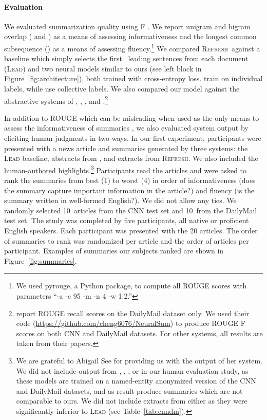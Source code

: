 \documentclass[11pt,a4paper]{article}
\newcommand\refresh{\textsc{Refresh}}
\begin{document}
\paragraph{Evaluation}
We evaluated summarization quality using F 
\cite{rouge}. We report unigram and bigram overlap (
and ) as a means of assessing informativeness and the
longest common subsequence () as a means of assessing
fluency.\footnote{We used pyrouge, a Python package, to compute all
  ROUGE scores with parameters ``-a -c 95 -m -n 4 -w 1.2.''}  We
compared \refresh\ against a baseline which simply selects the first
~leading sentences from each document (\textsc{Lead}) and two
neural models similar to ours (see left block in
Figure~\ref{fig:architecture}), both trained with cross-entropy loss.
 train on individual labels, while
 use collective labels. We also compared our
model against the abstractive systems of ,
, , and
.\footnote{ report ROUGE
  recall scores on the DailyMail dataset only. We used their code
  (\url{https://github.com/cheng6076/NeuralSum}) to produce ROUGE
  F scores on both CNN and DailyMail datasets. For other systems,
  all results are taken from their papers.}



In addition to ROUGE which can be misleading when used as the only
means to assess the informativeness of summaries
\cite{schluter:2017:EACLshort}, we also evaluated system output by
eliciting human judgments in two ways. In our first experiment,
participants were presented with a news article and summaries
generated by three systems: the \textsc{Lead} baseline, abstracts from
, and extracts from \refresh. We also included the
human-authored highlights.\footnote{We are grateful to Abigail See for
  providing us with the output of her system. We did not include
  output from , ,
  , or  in our human
  evaluation study, as these models are trained on a named-entity
  anonymized version of the CNN and DailyMail datasets, and as result
  produce  summaries which are not comparable to ours. We
  did not include extracts from  either as they were
  significantly inferior to \textsc{Lead} (see
  Table~\ref{tab:cnndm}).}  Participants read the articles and were
asked to rank the summaries from best (1) to worst (4) in order of
informativeness (does the summary capture important information in the
article?) and fluency (is the summary written in well-formed
English?). We did not allow any ties. We randomly selected 10~articles
from the CNN test set and 10~from the DailyMail test set. The study
was completed by five participants, all native or proficient English
speakers. Each participant was presented with the 20 articles. The
order of summaries to rank was randomized per article and the order of
articles per participant. Examples of summaries our subjects ranked
are shown in Figure~\ref{fig:summaries}.
\end{document}
